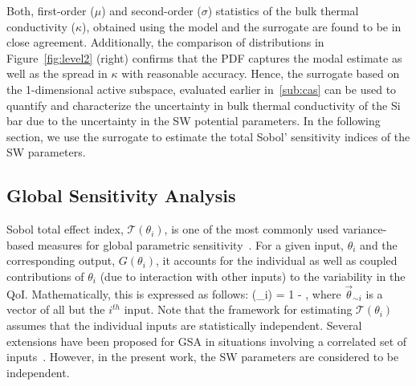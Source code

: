 %
Both, first-order ($\mu$) and second-order ($\sigma$) statistics of the bulk thermal conductivity ($\kappa$),
obtained using the model and the surrogate are found to be in close agreement. Additionally, the
comparison of distributions in Figure~\ref{fig:level2} (right) confirms that the PDF captures the modal
estimate as well as the spread in $\kappa$ with reasonable accuracy. Hence, the surrogate based on
the 1-dimensional active subspace, evaluated earlier in~\ref{sub:cas} can be used to quantify and
characterize the uncertainty in bulk thermal conductivity of the Si bar due to the uncertainty in the
SW potential parameters. In the following section, we use the surrogate to estimate the total Sobol'
sensitivity indices of the SW parameters.  


\subsection{Global Sensitivity Analysis}
\label{sub:gsa}

Sobol total effect index, $\mathcal{T}(\theta_i)$, is one of the most commonly used variance-based 
measures for global
parametric sensitivity~\cite{Sobol:2001}. For a given input, $\theta_i$ and the corresponding output, 
$G(\theta_i)$, it accounts for the individual as well as coupled contributions of $\theta_i$ (due to
interaction with other inputs)
to the variability in the QoI. Mathematically, this is expressed as follows:
%
\be
{}(\theta_i) = 1 - 
,
\label{eq:total}
\ee
%
where $\vec{\theta}_{\sim i}$ is a vector of all but the $i^{th}$ input. Note that the framework for 
estimating $\mathcal{T}(\theta_i)$ assumes that the individual inputs are statistically independent.
Several extensions have been proposed for GSA in situations involving a correlated set of
inputs~\cite{Borgonovo:2007,Li:2010,Jacques:2006,Xu:2007,Hart:2017}. However, in the present work,
the SW parameters are considered to be independent. 

